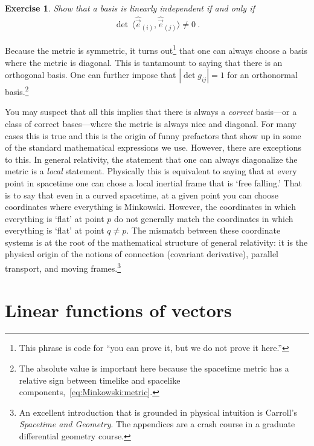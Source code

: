 \documentclass[
  11pt,
	colorful,
	raggedright,
]{tufte-style-thesis-flip}
\newtheorem{exercise}{Exercise}[section]
\begin{document}
\begin{exercise}
Show that a basis is linearly independent if and only if
\begin{align}
\det\,\langle \hat{\vec{e}}_{(i)}, \hat{\vec{e}}_{(j)} \rangle \neq 0 \ .  
\end{align}
\end{exercise}
Because the metric is symmetric, it turns out\footnote{This phrase is code for ``you can prove it, but we do not prove it here.''} that one can always choose a basis where the metric is diagonal. This is tantamount to saying that there is an orthogonal basis. One can further impose that $|\det g_{ij}| = 1$ for an orthonormal basis.\footnote{The absolute value is important here because the  spacetime metric has a relative sign between timelike and spacelike components,~\eqref{eq:Minkowski:metric}.}

You may suspect that all this implies that there is always a \emph{correct} basis---or a class of correct bases---where the metric is always nice and diagonal. For many cases this is true and this is the origin of funny prefactors that show up in some of the standard mathematical expressions we use. However, there are exceptions to this. In general relativity, the statement that one can always diagonalize the metric is a \emph{local} statement. Physically this is equivalent to saying that at every point in spacetime one can chose a local inertial frame that is `free falling.' That is to say that even in a curved spacetime, at a given point you can choose coordinates where everything is Minkowski. However, the coordinates in which everything is `flat' at point $p$ do not generally match the coordinates in which everything is `flat' at point $q\neq p$. The mismatch between these coordinate systems is at the root of the mathematical structure of general relativity: it is the physical origin of the notions of connection (covariant derivative), parallel transport, and moving frames.\footnote{An excellent introduction that is grounded in physical intuition is Carroll's \emph{Spacetime and Geometry}. The appendices are a crash course in a graduate differential geometry course.}



\section{Linear functions of vectors}
\end{document}
